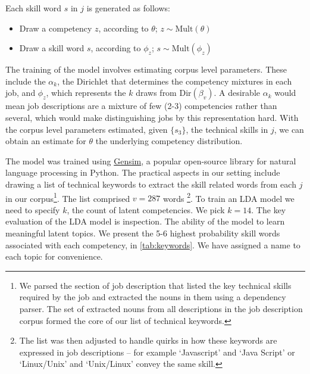 \documentclass{article}
\begin{document}
Each skill word \( s \) in \( j \) is generated as follows:
\begin{itemize}
    \item Draw a competency \( z \), according to \( \theta \); \( z \sim \text{Mult}(\theta) \)
    \item Draw a skill word \( s \), according to \( \phi_{z} \); \( s \sim \text{Mult}(\phi_{z}) \)
\end{itemize}

The training of the model involves estimating corpus level parameters. These include the \( \alpha_k \), the Dirichlet that determines the competency mixtures in each job, and \( \phi_{z} \), which represents the $k$ draws from \( \text{Dir}(\beta_v) \). A desirable \( \alpha_k \) would mean job descriptions are a mixture of few (2-3) competencies rather than several, which would make distinguishing jobs by this representation hard. With the corpus level parameters estimated, given \(\{s_3\}\), the technical skills in \( j \), we can obtain an estimate for \( \theta \) the underlying competency distribution.

The model was trained using \href{https://radimrehurek.com/gensim/}{Gensim}, a popular open-source library for natural language processing in Python. The practical aspects in our setting include drawing a list of technical keywords to extract the skill related words from each \( j \) in our corpus\footnote{We parsed the section of job description that listed the key technical skills required by the job and extracted the nouns in them using a dependency parser. The set of extracted nouns from all descriptions in the job description corpus formed the core of our list of technical keywords.}. The list comprised \( v = 287 \) words \footnote{The list was then adjusted to handle quirks in how these keywords are expressed in job descriptions – for example `Javascript’ and `Java Script’ or `Linux/Unix’ and `Unix/Linux’ convey the same skill.}. To train an LDA model we need to specify \( k \), the count of latent competencies. We pick \( k = 14 \). The key evaluation of the LDA model is inspection. The ability of the model to learn meaningful latent topics. We present the 5-6 highest probability skill words associated with each competency, in \autoref{tab:keywords}. We have assigned a name to each topic for convenience.
\end{document}

